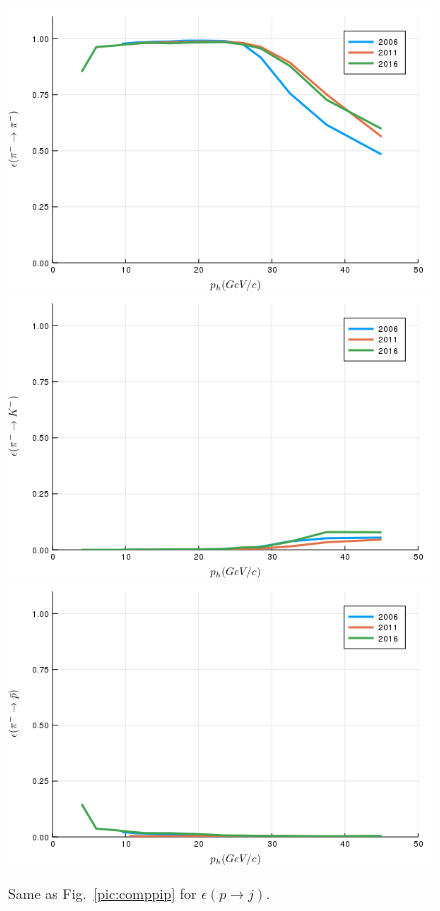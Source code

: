 \begin{figure}[!p]
  \centering
	\includegraphics[scale=0.35]{./gfx/t1/pim2pim.png}
  \includegraphics[scale=0.35]{./gfx/t1/pim2km.png}
  \includegraphics[scale=0.35]{./gfx/t1/pim2pm.png}
	\caption{Same as Fig.~\ref{pic:comppip} for $\epsilon(p \rightarrow j)$.}
	\label{pic:comppim}
\end{figure}

